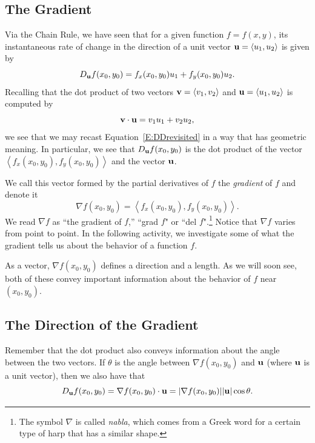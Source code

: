 

\subsection*{The Gradient}

Via the Chain Rule, we have seen that for a given function $f = f(x,y)$, its instantaneous rate of change in the direction of a unit vector $\mathbf{u} = \langle u_1, u_2 \rangle$ is given by 
\begin{equation} \label{E:DDrevisited}
D_{\mathbf{u}}f(x_0,y_0) = f_x(x_0,y_0)u_1 + f_y(x_0,y_0)u_2.
\end{equation}
Recalling that the dot product of two vectors $\mathbf{v} = \langle v_1, v_2 \rangle$ and $\mathbf{u} = \langle u_1, u_2 \rangle$ is computed by 
$$\mathbf{v} \cdot \mathbf{u} = v_1 u_1 + v_2 u_2,$$
we see that we may recast Equation~\eqref{E:DDrevisited} in a way
  that has geometric meaning.  In particular, we see that $D_{\mathbf{u}}f(x_0,y_0)$ is the dot product of the vector $\left\langle f_x(x_0,y_0), f_y(x_0,y_0) \right\rangle$ and the vector $\mathbf{u}$.
  
 We call this
  vector formed by the partial derivatives of $f$ the {\em gradient} of $f$ and denote it
  $$
  \nabla f(x_0,y_0) = \left\langle f_x(x_0,y_0), f_y(x_0,y_0) \right\rangle.
  $$
We read $\nabla f$ as ``the gradient of $f$,'' ``grad $f$" or ``del $f$".\footnote{The symbol
  $\nabla$ is called \emph{nabla}, which comes from a Greek word for a
  certain type of harp that has a similar shape.}  
Notice that $\nabla f$ varies from point to point.  In the following activity, we investigate some of what the gradient tells us about the behavior of a function $f$.

\newpage



As a vector, $\nabla f(x_0,y_0)$ defines a direction and a length.  As we will soon see, both
of these convey important information about the behavior of $f$ near
$(x_0,y_0)$.  

\subsection*{The Direction of the Gradient}

Remember that the dot product also conveys information about the angle
between the two vectors.  If $\theta$ is the angle between $\nabla
f(x_0,y_0)$ and $\mathbf{u}$ (where $\mathbf{u}$ is a unit vector), %
then we also have that
$$
D_{\mathbf{u}}f(x_0,y_0) = \nabla f(x_0,y_0)\cdot\mathbf{u} = |\nabla f(x_0,y_0)||\mathbf{u}|
\cos\theta.
$$

